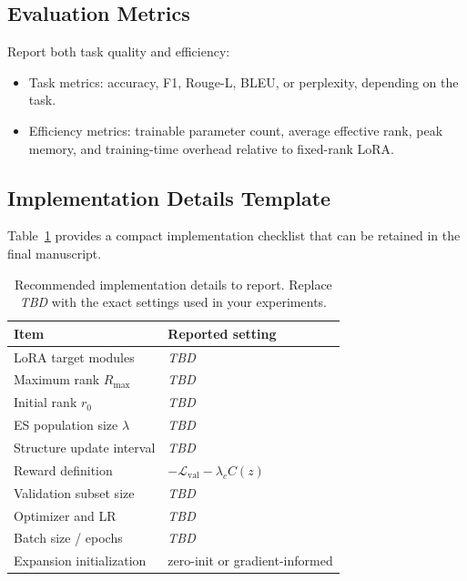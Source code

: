 \documentclass{article}
\newcommand{\Rmax}{R_{\max}}
\newcommand{\TODO}{\textit{TBD}}
\begin{document}
\subsection{Evaluation Metrics}
Report both task quality and efficiency:
\begin{itemize}[leftmargin=1.2em]
    \item Task metrics: accuracy, F1, Rouge-L, BLEU, or perplexity, depending on the task.
    \item Efficiency metrics: trainable parameter count, average effective rank, peak memory, and training-time overhead relative to fixed-rank LoRA.
\end{itemize}

\subsection{Implementation Details Template}
Table~\ref{tab:hparams} provides a compact implementation checklist that can be retained in the final manuscript.

\begin{table}[t]
    \centering
    \caption{Recommended implementation details to report. Replace \TODO{} with the exact settings used in your experiments.}
    \label{tab:hparams}
    \begin{tabularx}{\columnwidth}{>{\raggedright\arraybackslash}p{}X}
        \toprule
        Item & Reported setting \\
        \midrule
        LoRA target modules & \TODO{} \\
        Maximum rank $\Rmax$ & \TODO{} \\
        Initial rank $r_0$ & \TODO{} \\
        ES population size $\lambda$ & \TODO{} \\
        Structure update interval & \TODO{} \\
        Reward definition & $-\mathcal{L}_{\mathrm{val}} - \lambda_c C(z)$ \\
        Validation subset size & \TODO{} \\
        Optimizer and LR & \TODO{} \\
        Batch size / epochs & \TODO{} \\
        Expansion initialization & zero-init or gradient-informed \\
        \bottomrule
    \end{tabularx}
\end{table}
\end{document}
